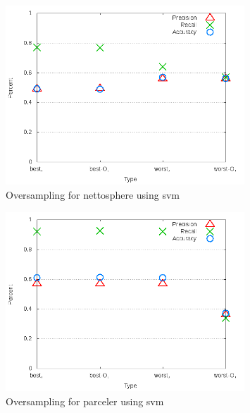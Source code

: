 \begin{figure}[!t]
\centering
\includegraphics[width=0.8\textwidth]{images/svm/test_4/nettosphere_sample_range.png}
\caption{Oversampling for nettosphere using \gls{svm}}
\label{fig:test_4_nettosphere_svm}
\end{figure}

\begin{figure}[!t]
\centering
\includegraphics[width=0.8\textwidth]{images/svm/test_4/parceler_sample_range.png}
\caption{Oversampling for parceler using \gls{svm}}
\label{fig:test_4_parceler_svm}
\end{figure}


